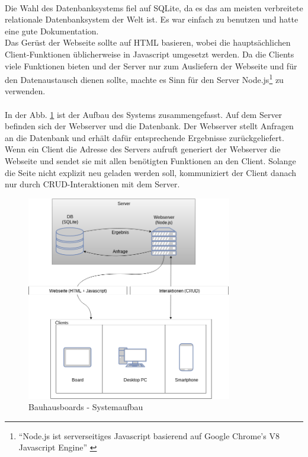 \\
Die Wahl des Datenbanksystems fiel auf SQLite, da es das am meisten verbreitete relationale Datenbanksystem der Welt ist. Es war einfach zu benutzen und hatte eine gute Dokumentation.
\\
Das Gerüst der Webseite sollte auf HTML basieren, wobei die hauptsächlichen Client-Funktionen üblicherweise in Javascript umgesetzt werden. Da die Clients viele Funktionen bieten und der Server nur zum Ausliefern der Webseite und für den Datenaustausch dienen sollte, machte es Sinn für den Server Node.js\footnote{``Node.js ist serverseitiges Javascript basierend auf Google Chrome's V8 Javascript Engine'' \cite{nodejs:website}} zu verwenden.
\\
\\
In der Abb. \ref{img:Systemaufbau} ist der Aufbau des Systems zusammengefasst. Auf dem Server befinden sich der Webserver und die Datenbank. Der Webserver stellt Anfragen an die Datenbank und erhält dafür entsprechende Ergebnisse zurückgeliefert.
\\
Wenn ein Client die Adresse des Servers aufruft generiert der Webserver die Webseite und sendet sie mit allen benötigten Funktionen an den Client. Solange die Seite nicht explizit neu geladen werden soll, kommuniziert der Client danach nur durch CRUD-Interaktionen mit dem Server.
\\
\begin{figure}[h!]
  \centering
    \includegraphics[width=0.8\textwidth]{./img/Systemaufbau.png}
  \caption{Bauhausboards - Systemaufbau}
  \label{img:Systemaufbau}
\end{figure}
